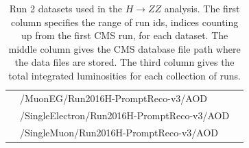 \begin{table}[h]
\begin{tabular}{l|l|l}
& /MuonEG/Run2016H-PromptReco-v3/AOD &  \\ 
& /SingleElectron/Run2016H-PromptReco-v3/AOD &  \\ 
& /SingleMuon/Run2016H-PromptReco-v3/AOD &  \\ 
\hline %
     \end{tabular}
    \caption{Run 2 datasets used in the $H\rightarrow ZZ$ analysis. The first column specifies the range of run ids, indices counting up from the first CMS run, for each dataset. The middle column gives the CMS database file path where the data files are stored. The third column gives the total integrated luminosities for each collection of runs.}
    \label{tab:datasets_data}
\end{table}


